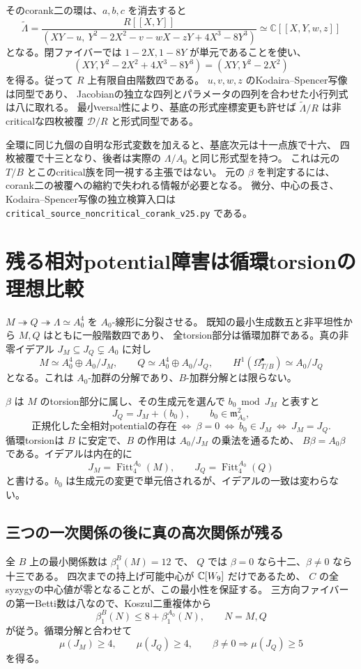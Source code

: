 そのcorank二の環は、$a,b,c$ を消去すると
\[
 \widetilde\Lambda=
 \frac{R[[X,Y]]}{(XY-u,\ Y^2-2X^2-v-wX-zY+4X^3-8Y^3)}
 \simeq\mathbb C[[X,Y,w,z]]
\]
となる。閉ファイバーでは $1-2X,1-8Y$ が単元であることを使い、
\[
 (XY,Y^2-2X^2+4X^3-8Y^3)=(XY,Y^2-2X^2)
\]
を得る。従って $R$ 上有限自由階数四である。
$u,v,w,z$ のKodaira--Spencer写像は同型であり、
Jacobianの独立な四列とパラメータの四列を合わせた小行列式は八に取れる。
最小versal性により、基底の形式座標変更も許せば
$\widetilde\Lambda/R$ は非criticalな四枚被覆 $\mathscr D/R$ と形式同型である。

全環に同じ九個の自明な形式変数を加えると、基底次元は十一点族で十六、
四枚被覆で十三となり、後者は実際の $\Lambda/A_0$ と同じ形式型を持つ。
これは元の $T/B$ とこのcritical族を同一視する主張ではない。
元の $\beta$ を判定するには、corank二の被覆への縮約で失われる情報が必要となる\cite{PaperIII}。
微分、中心の長さ、Kodaira--Spencer写像の独立検算入口は
\nolinkurl{critical_source_noncritical_corank_v25.py} である。

\section{残る相対potential障害は循環torsionの理想比較}

$M\twoheadrightarrow Q\twoheadrightarrow\Lambda\simeq A_0^4$ を $A_0$-線形に分裂させる。
既知の最小生成数五と非平坦性から $M,Q$ はともに一般階数四であり、
全torsion部分は循環加群である。真の非零イデアル $J_M\subseteq J_Q\subsetneq A_0$ に対し
\[
 M\simeq A_0^4\oplus A_0/J_M,\qquad
 Q\simeq A_0^4\oplus A_0/J_Q,\qquad
 H^1(\Omega^\bullet_{T/B})\simeq A_0/J_Q
\]
となる。これは $A_0$-加群の分解であり、$B$-加群分解とは限らない。

$\beta$ は $M$ のtorsion部分に属し、その生成元を選んで $b_0\bmod J_M$ と表すと
\[
 J_Q=J_M+(b_0),\qquad b_0\in\mathfrak m_{A_0}^2,
\]
\[
 \text{正規化した全相対potentialの存在}
 \ \Longleftrightarrow\ \beta=0
 \ \Longleftrightarrow\ b_0\in J_M
 \ \Longleftrightarrow\ J_M=J_Q.
\]
循環torsionは $B$ に安定で、$B$ の作用は $A_0/J_M$ の乗法を通るため、
$B\beta=A_0\beta$ である。イデアルは内在的に
\[
 J_M=\operatorname{Fitt}^{A_0}_4(M),\qquad
 J_Q=\operatorname{Fitt}^{A_0}_4(Q)
\]
と書ける。$b_0$ は生成元の変更で単元倍されるが、イデアルの一致は変わらない。

\subsection{三つの一次関係の後に真の高次関係が残る}
全 $B$ 上の最小関係数は $\beta_1^B(M)=12$ で、
$Q$ では $\beta=0$ なら十二、$\beta\ne0$ なら十三である。
四次までの持上げ可能中心が $\mathbb C[W_9]$ だけであるため、
$C$ の全syzygyの中心値が零となることが、この最小性を保証する。
三方向ファイバーの第一Betti数は八なので、Koszul二重複体から
\[
 \beta_1^B(N)\le8+\beta_1^{A_0}(N),\qquad N=M,Q
\]
が従う。循環分解と合わせて
\[
 \mu(J_M)\ge4,\qquad\mu(J_Q)\ge4,
 \qquad\beta\ne0\Longrightarrow\mu(J_Q)\ge5
\]
を得る。

